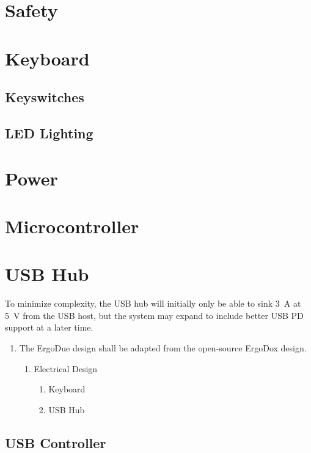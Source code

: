 \documentclass[10pt]{report}
\begin{document}
\section{Safety}

\section{Keyboard}

\subsection{Keyswitches}

\subsection{LED Lighting}

\section{Power}

\section{Microcontroller}

\section{USB Hub}

To minimize complexity, the USB hub will initially only be able to sink \qty{3}{\ampere} at \qty{5}{\volt} from the USB host, but the system may expand to include better USB PD support at a later time.

\begin{enumerate}
    \item The ErgoDue design shall be adapted from the open-source ErgoDox design.
    \begin{enumerate}
        \item Electrical Design
        \begin{enumerate}
            \item Keyboard
            \item USB Hub
        \end{enumerate}
    \end{enumerate}
\end{enumerate}
\subsection{USB Controller}
\end{document}
